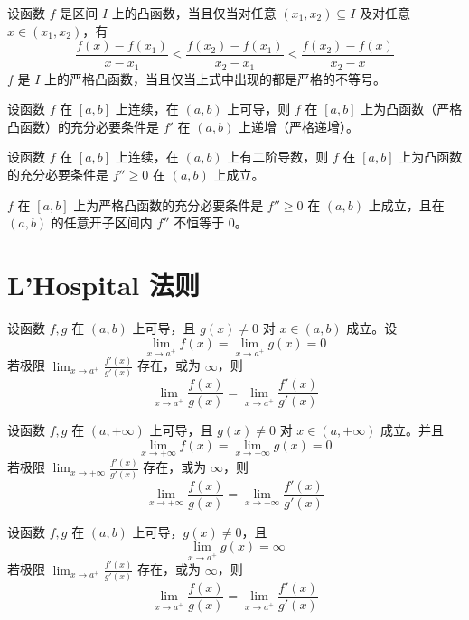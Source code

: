 \begin{theorem}
    设函数 $f$ 是区间 $I$ 上的凸函数，当且仅当对任意 $(x_1,x_2) \subseteq I$ 及对任意 $x \in (x_1,x_2)$，有
    \[\frac{f(x) - f(x_1)}{x - x_1} \leqslant \frac{f(x_2) - f(x_1)}{x_2 - x_1} \leqslant \frac{f(x_2) - f(x)}{x_2 - x}\]
    $f$ 是 $I$ 上的严格凸函数，当且仅当上式中出现的都是严格的不等号。
\end{theorem}

\begin{theorem}
    设函数 $f$ 在 $[a,b]$ 上连续，在 $(a,b)$ 上可导，则 $f$ 在 $[a,b]$ 上为凸函数（严格凸函数）的充分必要条件是 $f'$ 在 $(a,b)$ 上递增（严格递增）。
\end{theorem}

\begin{theorem}
    设函数 $f$ 在 $[a,b]$ 上连续，在 $(a,b)$ 上有二阶导数，则 $f$ 在 $[a,b]$ 上为凸函数的充分必要条件是 $f'' \geqslant 0$ 在 $(a,b)$ 上成立。

    $f$ 在 $[a,b]$ 上为严格凸函数的充分必要条件是 $f'' \geqslant 0$ 在 $(a,b)$ 上成立，且在 $(a,b)$ 的任意开子区间内 $f''$ 不恒等于 $0$。
\end{theorem}

\section{L'Hospital 法则}

\begin{theorem}
    设函数 $f,g$ 在 $(a,b)$ 上可导，且 $g(x) \ne 0$ 对 $x \in (a,b)$ 成立。设
    \[\lim_{x \to a^{+}}f(x) = \lim_{x \to a^{+}}g(x) = 0\]
    若极限  $\displaystyle \lim_{x \to a^{+}}\frac{f'(x)}{g'(x)}$ 存在，或为 $\infty$，则
    \[\lim_{x \to a^{+}}\frac{f(x)}{g(x)} = \lim_{x \to a^{+}}\frac{f'(x)}{g'(x)}\]
\end{theorem}

\begin{theorem}
    设函数 $f,g$ 在 $(a,+\infty)$ 上可导，且 $g(x) \ne 0$ 对 $x \in (a,+\infty)$ 成立。并且
    \[\lim_{x \to +\infty}f(x) = \lim_{x \to +\infty}g(x) = 0\]
    若极限 $\displaystyle \lim_{x \to +\infty}\frac{f'(x)}{g'(x)}$ 存在，或为 $\infty$，则
    \[\lim_{x \to +\infty}\frac{f(x)}{g(x)} = \lim_{x \to +\infty}\frac{f'(x)}{g'(x)}\]
\end{theorem}

\begin{theorem}
    设函数 $f,g$ 在 $(a,b)$ 上可导，$g(x) \ne 0$，且
    \[ \lim_{x \to a^{+}}g(x) = \infty\]
    若极限  $\displaystyle \lim_{x \to a^{+}}\frac{f'(x)}{g'(x)}$ 存在，或为 $\infty$，则
    \[\lim_{x \to a^{+}}\frac{f(x)}{g(x)} = \lim_{x \to a^{+}}\frac{f'(x)}{g'(x)}\]
\end{theorem}


